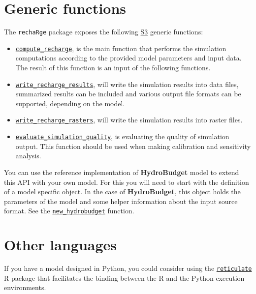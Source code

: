 \documentclass[
]{book}
\providecommand{\tightlist}{%
  \setlength{\itemsep}{0pt}\setlength{\parskip}{0pt}}
\begin{document}
\hypertarget{generic-functions}{%
\section{Generic functions}\label{generic-functions}}

The \texttt{rechaRge} package exposes the following \href{https://adv-r.hadley.nz/s3.html}{S3} generic functions:

\begin{itemize}
\tightlist
\item
  \href{https://gwrecharge.github.io/rechaRge/reference/compute_recharge.html}{\texttt{compute\_recharge}}, is the main function that performs the simulation computations according to the provided model parameters and input data. The result of this function is an input of the following functions.
\item
  \href{https://gwrecharge.github.io/rechaRge/reference/write_recharge_results.html}{\texttt{write\_recharge\_results}}, will write the simulation results into data files, summarized results can be included and various output file formats can be supported, depending on the model.
\item
  \href{https://gwrecharge.github.io/rechaRge/reference/write_recharge_rasters.html}{\texttt{write\_recharge\_rasters}}, will write the simulation results into raster files.
\item
  \href{https://gwrecharge.github.io/rechaRge/reference/evaluate_simulation_quality.html}{\texttt{evaluate\_simulation\_quality}}, is evaluating the quality of simulation output. This function should be used when making calibration and sensitivity analysis.
\end{itemize}

You can use the reference implementation of \textbf{HydroBudget} model to extend this API with your own model. For this you will need to start with the definition of a model specific object. In the case of \textbf{HydroBudget}, this object holds the parameters of the model and some helper information about the input source format. See the \href{https://gwrecharge.github.io/rechaRge/reference/new_hydrobudget.html}{\texttt{new\_hydrobudget}} function.

\hypertarget{other-languages}{%
\section{Other languages}\label{other-languages}}

If you have a model designed in Python, you could consider using the \href{https://rstudio.github.io/reticulate/}{\texttt{reticulate}} R package that facilitates the binding between the R and the Python execution environments.
\end{document}
